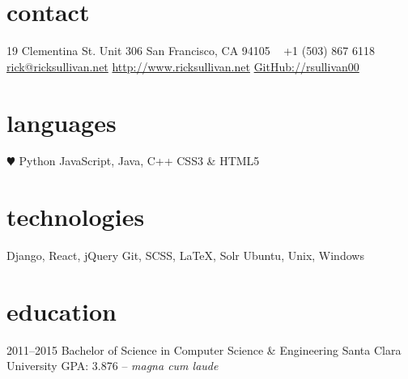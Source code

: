 \documentclass[]{friggeri-cv} %
\begin{document}


\begin{aside} %
\section{contact}
19 Clementina St.
Unit 306
San Francisco, CA 94105
~
+1 (503) 867 6118
~
\href{mailto:rick@ricksullivan.net}{rick@ricksullivan.net}
\href{http://www.ricksullivan.net}{http://www.ricksullivan.net}
\href{http://github.com/rsullivan00}{GitHub://rsullivan00}
%
\section{languages}
{\color{red} $\varheartsuit$} Python
JavaScript, Java, C++
CSS3 \& HTML5
%
\section{technologies}
Django, React, jQuery
Git, SCSS, LaTeX, Solr
Ubuntu, Unix, Windows
\end{aside}

\section{education}

\begin{entrylist}

\entry
{2011--2015}
{Bachelor of Science {\normalfont in Computer Science \& Engineering}}
{Santa Clara University}
{GPA: 3.876 -- \emph{magna cum laude}}



\end{entrylist}

\end{document}
